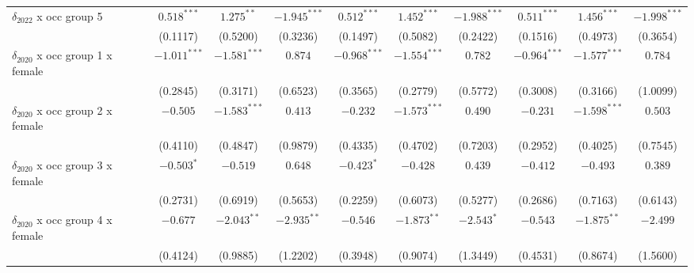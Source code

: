 \begin{tabular}{l|ccc|ccc|ccc}
$\delta_{2022}$ x occ group 5          &           $0.518^{***}$ &    $1.275^{**}$ &  $-1.945^{***}$ &            $0.512^{***}$ &   $1.452^{***}$ &  $-1.988^{***}$ &            $0.511^{***}$ &   $1.456^{***}$ &  $-1.998^{***}$ \\
                                       &                (0.1117) &        (0.5200) &        (0.3236) &                 (0.1497) &        (0.5082) &        (0.2422) &                 (0.1516) &        (0.4973) &        (0.3654) \\
$\delta_{2020}$ x occ group 1 x female &          $-1.011^{***}$ &  $-1.581^{***}$ &         $0.874$ &           $-0.968^{***}$ &  $-1.554^{***}$ &         $0.782$ &           $-0.964^{***}$ &  $-1.577^{***}$ &         $0.784$ \\
                                       &                (0.2845) &        (0.3171) &        (0.6523) &                 (0.3565) &        (0.2779) &        (0.5772) &                 (0.3008) &        (0.3166) &        (1.0099) \\
$\delta_{2020}$ x occ group 2 x female &                $-0.505$ &  $-1.583^{***}$ &         $0.413$ &                 $-0.232$ &  $-1.573^{***}$ &         $0.490$ &                 $-0.231$ &  $-1.598^{***}$ &         $0.503$ \\
                                       &                (0.4110) &        (0.4847) &        (0.9879) &                 (0.4335) &        (0.4702) &        (0.7203) &                 (0.2952) &        (0.4025) &        (0.7545) \\
$\delta_{2020}$ x occ group 3 x female &              $-0.503^*$ &        $-0.519$ &         $0.648$ &               $-0.423^*$ &        $-0.428$ &         $0.439$ &                 $-0.412$ &        $-0.493$ &         $0.389$ \\
                                       &                (0.2731) &        (0.6919) &        (0.5653) &                 (0.2259) &        (0.6073) &        (0.5277) &                 (0.2686) &        (0.7163) &        (0.6143) \\
$\delta_{2020}$ x occ group 4 x female &                $-0.677$ &   $-2.043^{**}$ &   $-2.935^{**}$ &                 $-0.546$ &   $-1.873^{**}$ &      $-2.543^*$ &                 $-0.543$ &   $-1.875^{**}$ &        $-2.499$ \\
                                       &                (0.4124) &        (0.9885) &        (1.2202) &                 (0.3948) &        (0.9074) &        (1.3449) &                 (0.4531) &        (0.8674) &        (1.5600) \\

\end{tabular}
